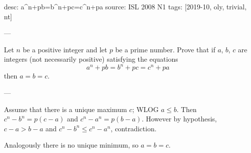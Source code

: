 desc: a^n+pb=b^n+pc=c^n+pa
source: ISL 2008 N1
tags: [2019-10, oly, trivial, nt]

---

Let $n$ be a positive integer and let $p$ be a prime number. Prove that if $a$, $b$, $c$ are integers (not necessarily positive) satisfying the equations \[a^n+pb=b^n+pc=c^n+pa\]
then $a=b=c$.

---

Assume that there is a unique maximum $c$; WLOG $a\le b$. Then $c^n-b^n=p(c-a)$ and $c^n-a^n=p(b-a)$. However by hypothesis, $c-a>b-a$ and $c^n-b^n\le c^n-a^n$, contradiction.

Analogously there is no unique minimum, so $a=b=c$.
